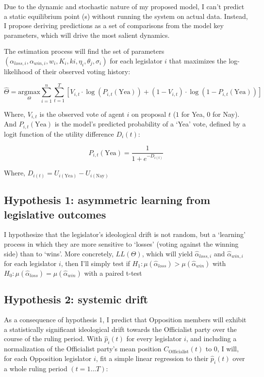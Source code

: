 \documentclass{article}
\begin{document}
	Due to the dynamic and stochastic nature of my proposed model, I can't predict a static equilibrium point (s) without running the system on actual data. Instead, I propose deriving predictions as a set of comparisons from the model key parameters, which will drive the most salient dynamics.
	
	The estimation process will find the set of parameters $({\alpha_{loss, i}, \alpha_{win, i}, w_{i}, K_{i}, k{i}, \eta_{i}, \theta_{j}, \sigma_{i} })$ for each legislator $i$ that maximizes the log-likelihood of their observed voting history:
	
	\begin{equation}
		\hat{\Theta} = \underset{\Theta}{\text{argmax}} \sum_{i=1}^{n} \sum_{t=1}^{T} \left[ V_{i,t} \cdot \log(P_{i,t}(\text{Yea})) + (1 - V_{i,t}) \cdot \log(1 - P_{i,t}(\text{Yea})) \right]
	\end{equation}
	
	Where, $V_{i,t}$ is the observed vote of agent $i$ on proposal $t$ ($1$ for Yea, $0$ for Nay). And $P_{i,t}(\text{Yea})$ is the model's predicted probability of a `Yea' vote, defined by a logit function of the utility difference $D_i(t)$:
	
	\begin{equation}
		P_{i,t}(\text{Yea}) = \frac{1}{1 + e^{-D_{i(t)}}}
	\end{equation}
	
	Where,  $D_{i(t)} = U_{i(\text{Yea})} - U_{i(\text{Nay})}$
	
	\subsection{Hypothesis 1: asymmetric learning from legislative outcomes}
	
	I hypothesize that the legislator's ideological drift is not random, but a `learning' process in which they are more sensitive to `losses' (voting against the winning side) than to `wins'. More concretely, $LL(\Theta)$, which will yield $\hat{\alpha}_{loss, i}$ and $\hat{\alpha}_{win, i}$ for each legislator $i$, then I'll simply test if $H_{1}: \mu(\hat{\alpha}_{loss}) > \mu(\hat{\alpha}_{win})$ with $H_{0}: \mu(\hat{\alpha}_{loss}) = \mu(\hat{\alpha}_{win})$ with a paired t-test
	
	\subsection{Hypothesis 2: systemic drift}
	As a consequence of hypothesis 1, I predict that Opposition members will exhibit a statistically significant ideological drift towards the Officialist party over the course of the ruling period. With $\hat{p}_{i}(t)$ for every legislator $i$, and including a normalization of the Officialist party's mean position $C_{\text{Officialist}}(t)$ to 0, I will, for each Opposition legislator $i$, fit a simple linear regression to their $\hat{p}_{i}(t)$ over a whole ruling period $(t = 1 \dots T)$:
	
\end{document}
